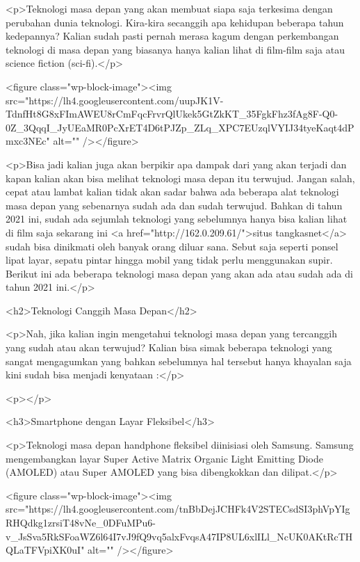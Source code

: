 <p>Teknologi masa depan yang akan membuat siapa saja terkesima dengan perubahan dunia teknologi. Kira-kira secanggih apa kehidupan beberapa tahun kedepannya? Kalian sudah pasti pernah merasa kagum dengan perkembangan teknologi di masa depan yang biasanya hanya kalian lihat di film-film saja atau science fiction (sci-fi).</p>



<figure class="wp-block-image"><img src="https://lh4.googleusercontent.com/uupJK1V-TdnfHt8G8xFImAWEU8rCmFqcFrvrQlUkek5GtZkKT_35FgkFhz3fAg8F-Q0-0Z_3QqqI_JyUEaMR0PcXrET4D6tPJZp_ZLq_XPC7EUzqlVYIJ34tyeKaqt4dPmxc3NEc" alt="" /></figure>



<p>Bisa jadi kalian juga akan berpikir apa dampak dari yang akan terjadi dan kapan kalian akan bisa melihat teknologi masa depan itu terwujud. Jangan salah, cepat atau lambat kalian tidak akan sadar bahwa ada beberapa alat teknologi masa depan yang sebenarnya sudah ada dan sudah terwujud. Bahkan di tahun 2021 ini, sudah ada sejumlah teknologi yang sebelumnya hanya bisa kalian lihat di film saja sekarang ini <a href="http://162.0.209.61/">situs tangkasnet</a> sudah bisa dinikmati oleh banyak orang diluar sana. Sebut saja seperti ponsel lipat layar, sepatu pintar hingga mobil yang tidak perlu menggunakan supir. Berikut ini ada beberapa teknologi masa depan yang akan ada atau sudah ada di tahun 2021 ini.</p>



<h2>Teknologi Canggih Masa Depan</h2>



<p>Nah, jika kalian ingin mengetahui teknologi masa depan yang tercanggih yang sudah atau akan terwujud? Kalian bisa simak beberapa teknologi yang sangat mengagumkan yang bahkan sebelumnya hal tersebut hanya khayalan saja kini sudah bisa menjadi kenyataan :</p>



<p></p>



<h3>Smartphone dengan Layar Fleksibel</h3>



<p>Teknologi masa depan handphone fleksibel diinisiasi oleh Samsung. Samsung mengembangkan layar Super Active Matrix Organic Light Emitting Diode (AMOLED) atau Super AMOLED yang bisa dibengkokkan dan dilipat.</p>



<figure class="wp-block-image"><img src="https://lh4.googleusercontent.com/tnBbDejJCHFk4V2STECsdSI3phVpYIgRHQdkg1zrsiT48vNe_0DFuMPu6-v_JsSva5RkSFoaWZ6l64I7vJ9fQ9vq5alxFvqsA47IP8UL6xlILl_NcUK0AKtRcTHQLaTFVpiXK0uI" alt="" /></figure>



